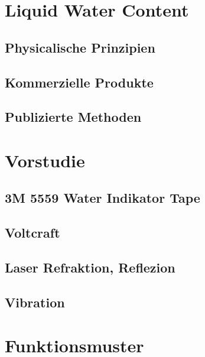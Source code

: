 \documentclass[a4paper,12pt]{article}
\begin{document}
\section{Liquid Water Content}
\subsection{Physicalische Prinzipien}

\subsection{Kommerzielle Produkte}

\subsection{Publizierte Methoden}


\section{Vorstudie}

\subsection{3M 5559 Water Indikator Tape}


\subsection{Voltcraft}


\subsection{Laser Refraktion, Reflezion}


\subsection{Vibration}


\section{Funktionsmuster}
\end{document}
